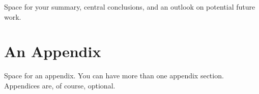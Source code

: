 \documentclass[a4paper,oneside,10pt,ngerman,english]{scrartcl}
\begin{document}
Space for your summary, central conclusions, and an outlook on potential future work.



\printbibliography

\appendix


\section{An Appendix}
\label{app:an-appendix}

Space for an appendix.
You can have more than one appendix section.
Appendices are, of course, optional.



\cleardoubleoddpage
\end{document}
